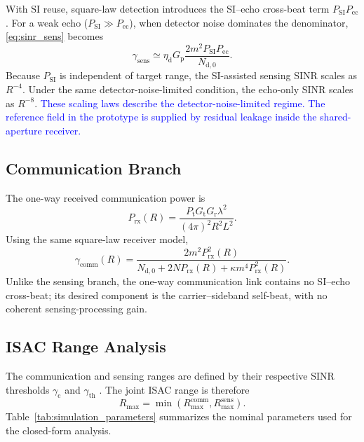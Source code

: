\documentclass[10pt,journal]{IEEEtran}
\DeclareRobustCommand{\rev}[1]{\textcolor{blue}{#1}}
\begin{document}
With SI reuse, square-law detection introduces the SI--echo cross-beat
term $P_{\mathrm{SI}}P_{\mathrm{ec}}$. For a weak echo
($P_{\mathrm{SI}}\gg P_{\mathrm{ec}}$), when detector noise dominates
the denominator, \eqref{eq:sinr_sens} becomes
\begin{equation}
\gamma_{\mathrm{sens}}
\simeq
\eta_{\mathrm d}G_{\mathrm p}
\frac{
2m^2P_{\mathrm{SI}}P_{\mathrm{ec}}
}{
N_{\mathrm{d},0}
}.
\label{eq:sinr_weak}
\end{equation}
Because $P_{\mathrm{SI}}$ is independent of target range, the
SI-assisted sensing SINR scales as $R^{-4}$. Under the same
detector-noise-limited condition, the echo-only SINR scales as
$R^{-8}$. \rev{These scaling laws describe the detector-noise-limited regime. The
reference field in the prototype is supplied by residual leakage
inside the shared-aperture receiver.}

\subsection{Communication Branch}
\label{sec:comm_branch}

The one-way received communication power is
\begin{equation}
P_{\mathrm{rx}}(R)=
\frac{P_{\mathrm t}G_{\mathrm t}G_{\mathrm r}\lambda^2}
{(4\pi)^2R^2L^2}.
\label{eq:prx}
\end{equation}
Using the same square-law receiver model,
\begin{equation}
\gamma_{\mathrm{comm}}(R)=
\frac{2m^2P_{\mathrm{rx}}^2(R)}
{N_{\mathrm{d},0}+2NP_{\mathrm{rx}}(R)
+\kappa m^4P_{\mathrm{rx}}^2(R)}.
\label{eq:sinr_comm}
\end{equation}
Unlike the sensing branch, the one-way communication link contains no
SI--echo cross-beat; its desired component is the carrier--sideband
self-beat, with no coherent sensing-processing gain.


\subsection{ISAC Range Analysis}
\label{sec:isac_range}

The communication and sensing ranges are defined by their respective
SINR thresholds $\gamma_{\mathrm c}$ and $\gamma_{\mathrm{th}}$
\cite{sturm_waveform_2011}. The joint ISAC range is therefore
\begin{equation}
R_{\max}
=
\min\!\left(
R_{\max}^{\mathrm{comm}},
R_{\max}^{\mathrm{sens}}
\right).
\label{eq:rmax}
\end{equation}
Table~\ref{tab:simulation_parameters} summarizes the nominal parameters
used for the closed-form analysis.
\end{document}
